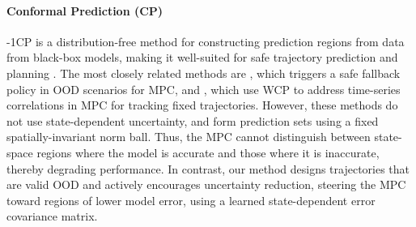\documentclass{l4dc2026}
\begin{document}
\vspace{-6pt}
\paragraph{Conformal Prediction (CP)}
\looseness-1CP \citep{vovk2005algorithmic} is a distribution-free method for constructing prediction regions from data from black-box models, making it well-suited for safe trajectory prediction and planning \citep{DBLP:journals/ral/LindemannCSP23, DBLP:conf/l4dc/DixitLWCPB23, DBLP:conf/nips/SunJQNKS23, DBLP:conf/cdc/MuthaliSDLRFT23, muenprasitivej2025probabilistically}. The most closely related methods are \cite{DBLP:conf/l4dc/ContrerasSS25}, which triggers a safe fallback policy in OOD scenarios for MPC, and \cite{DBLP:conf/cdc/CheeHP23, DBLP:conf/l4dc/CheeSHP24}, which use WCP to address time-series correlations in MPC for tracking fixed trajectories. However, these methods do not use state-dependent uncertainty, and form prediction sets using a fixed spatially-invariant norm ball. Thus, the MPC cannot distinguish between state-space regions where the model is accurate and those where it is inaccurate, thereby degrading performance. In contrast, our method designs trajectories that are valid OOD and actively encourages uncertainty reduction, steering the MPC toward regions of lower model error, using a learned state-dependent error covariance matrix.

\end{document}
